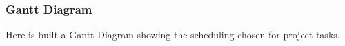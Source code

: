 \subsubsection{Gantt Diagram}
Here is built a Gantt Diagram showing the scheduling chosen for \myTaxiService{} project tasks.
\begin{center}
	\begin{ganttchart}[hgrid=true, x unit=2.75mm, link bulge=0.75]{1}{42}
		  \\
			   \\
		 \\
		 \\
		 \\
		 \\
		 \\
		 \\
		 \\
		 \\
		 \\
		 \\
		 \\
		 \\
		 \\
	\end{ganttchart}
\end{center}
%